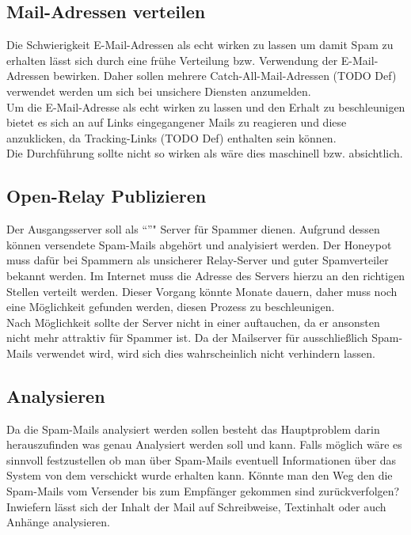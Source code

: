 \documentclass[a4paper,11pt,singlespacing]{article}
\begin{document}
	\subsection{Mail-Adressen verteilen}\label{sec:ProblemstellungMailsVerteilen}
		Die Schwierigkeit E-Mail-Adressen als echt wirken zu lassen um damit Spam zu erhalten lässt sich durch eine frühe Verteilung bzw. Verwendung der E-Mail-Adressen bewirken.
		Daher sollen mehrere Catch-All-Mail-Adressen (TODO Def) verwendet werden um sich bei unsichere Diensten anzumelden. %
		\\
		Um die E-Mail-Adresse als echt wirken zu lassen und den Erhalt zu beschleunigen bietet es sich an auf Links eingegangener Mails zu reagieren und diese anzuklicken, da Tracking-Links (TODO Def) enthalten sein können.
		\\
		Die Durchführung sollte nicht so wirken als wäre dies maschinell bzw. absichtlich.
	
	\subsection{Open-Relay Publizieren}\label{sec:ProblemstellungPublizieren}
		Der Ausgangsserver soll als "`"'" Server für Spammer dienen.
		Aufgrund dessen können versendete Spam-Mails abgehört und analyisiert werden.
		Der Honeypot muss dafür bei Spammern als unsicherer Relay-Server und guter Spamverteiler bekannt werden. %
		Im Internet muss die Adresse des Servers hierzu an den richtigen Stellen verteilt werden.
		Dieser Vorgang könnte Monate dauern, daher muss noch eine Möglichkeit gefunden werden, diesen Prozess zu beschleunigen.
		\\
		Nach Möglichkeit sollte der Server nicht in einer   auftauchen, da er ansonsten nicht mehr attraktiv für Spammer ist.
		Da der Mailserver für ausschließlich Spam-Mails verwendet wird, wird sich dies wahrscheinlich nicht verhindern lassen.

	\subsection{Analysieren}\label{sec:ProblemstellungAnalysieren}
		Da die Spam-Mails analysiert werden sollen besteht das Hauptproblem darin herauszufinden was genau Analysiert werden soll und kann.
		Falls möglich wäre es sinnvoll festzustellen ob man über Spam-Mails eventuell Informationen über das System von dem verschickt wurde erhalten kann.
		Könnte man den Weg den die Spam-Mails vom Versender bis zum Empfänger gekommen sind zurückverfolgen?
		Inwiefern lässt sich der Inhalt der Mail auf Schreibweise, Textinhalt oder auch Anhänge analysieren.
\end{document}

